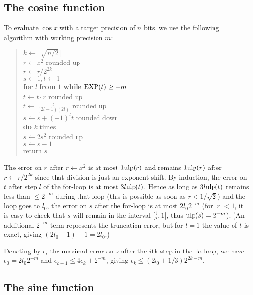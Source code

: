 \documentclass[12pt]{amsart}
\def\q{\hspace*{5mm}}
\def\ulp{{\rm ulp}}
\begin{document}
\subsection{The cosine function}

To evaluate $\cos x$ with a target precision of $n$ bits, we use the following
algorithm with working precision $m$:
\begin{quote}
$k \leftarrow \lfloor \sqrt{n/2} \rfloor$ \\
$r \leftarrow x^2$ rounded up \\ %
$r \leftarrow r/2^{2k}$ \\ %
$s \leftarrow 1, t \leftarrow 1$ \\ %
{\bf for} $l$ {\bf from} $1$ {\bf while} ${\rm EXP}(t) \ge -m$ \\
\q $t \leftarrow t \cdot r$ rounded up \\ %
\q $t \leftarrow \frac{t}{(2l-1)(2l)}$ rounded up \\ %
\q $s \leftarrow s + (-1)^l t$ rounded down\\ %
{\bf do} $k$ times \\
\q $s \leftarrow 2 s^2$ rounded up \\
\q $s \leftarrow s - 1$ \\
return $s$ \\
\end{quote}
The error on $r$ after $r \leftarrow x^2$
is at most $1 \ulp(r)$ and remains $1 \ulp(r)$ after
$r \leftarrow r/2^{2k}$ since that division is just an exponent shift.
By induction, the error on $t$ after step $l$ of the for-loop is at most
$3 l \ulp(t)$.
Hence as long as $3 l \ulp(t)$ remains less than $\le 2^{-m}$
during that loop
(this is possible as soon as $r < 1/\sqrt{2}$)
and the loop goes to $l_0$, the error on $s$ after the for-loop is at most
$2 l_0 2^{-m}$ (for $|r| < 1$, it is easy to check that $s$ will remain
in the interval $[\frac{1}{2}, 1[$, thus $\ulp(s) = 2^{-m}$).
(An additional $2^{-m}$ term represents the truncation error,
but for $l=1$ the value of $t$ is exact, giving $(2 l_0 - 1) + 1 = 2 l_0$.)

Denoting by $\epsilon_i$ the maximal error on $s$ after the $i$th step
in the do-loop, we have $\epsilon_0 = 2 l_0 2^{-m}$ and
$\epsilon_{k+1} \le 4 \epsilon_k + 2^{-m}$,
giving $\epsilon_k \le (2 l_0+1/3) 2^{2k-m}$.

\subsection{The sine function}
\end{document}
